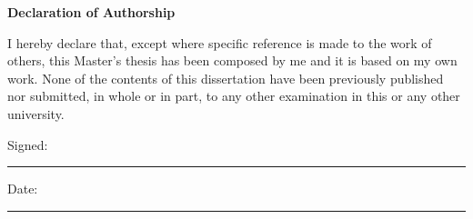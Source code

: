 \vspace*{4cm}
\Huge
\textbf{Declaration of Authorship} \label{sec:acknowledgments}
\normalsize

\vspace{1cm}

I hereby declare that, except where specific reference is made to the work of others, this Master's thesis has been composed by me and it is based on my own work.
None of the contents of this dissertation have been previously published nor submitted, in whole or in part, to any other examination in this or any other university.

\vspace{2cm}

Signed:

\rule[0.3cm]{.6\textwidth}{0.2pt}

\vspace{2cm}

Date:

\rule[0.3cm]{.6\textwidth}{0.2pt}


\vspace*{\fill}
